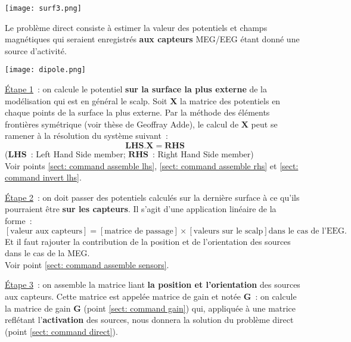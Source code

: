 \centerline{\texttt{[image: surf3.png]}}

\noindent
Le problème direct consiste à estimer la valeur des potentiels et champs magnétiques qui seraient enregistrés \textbf{aux
capteurs} MEG/EEG étant donné une source d'activité.

\centerline{\texttt{[image: dipole.png]}}

\noindent
\underline{Étape 1}~: on calcule le potentiel \textbf{sur la surface la plus externe} de la modélisation qui est en général le
scalp.  Soit $\mathbf{X}$ la matrice des potentiels en chaque points de la surface la plus externe. Par la méthode des éléments
frontières symétrique (voir thèse de Geoffray Adde), le calcul de $\mathbf{X}$ peut se ramener à la résolution du système
suivant~:
\[
    \mathbf{LHS} . \mathbf{X} = \mathbf{RHS}
\]
($\mathbf{LHS}$~: Left Hand Side member; $\mathbf{RHS}$~: Right Hand Side member)\\
Voir points \ref{sect: command assemble lhs}, \ref{sect: command assemble rhs} et \ref{sect: command invert lhs}.

\medskip

\noindent
\underline{Étape 2}~: on doit passer des potentiels calculés sur la dernière surface à ce qu'ils pourraient être \textbf{sur les
capteurs}. Il s'agit d'une application linéaire de la forme~:\\
\[
    \left[ \mbox{valeur aux capteurs} \right] =
    \left[ \mbox{matrice de passage} \right] \times \left[ \mbox{valeurs sur le scalp} \right] \mbox{dans le cas de l'EEG.}
\]
Et il faut rajouter la contribution de la position et de l'orientation des sources dans le cas de la MEG.\\
Voir point \ref{sect: command assemble sensors}.

\medskip

\noindent
\underline{Étape 3}~: on assemble la matrice liant \textbf{la position et l'orientation} des sources aux capteurs. Cette matrice
est appelée matrice de gain et notée $\mathbf{G}$~: on calcule la matrice de gain $\mathbf{G}$ (point \ref{sect: command gain})
qui, appliquée à une matrice reflétant l'\textbf{activation} des sources, nous donnera la solution du problème direct (point
\ref{sect: command direct}).

